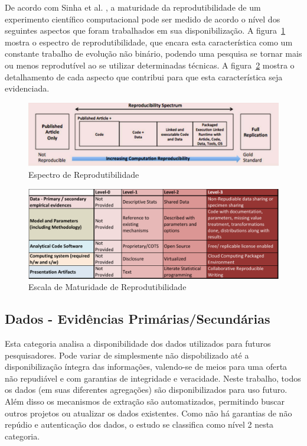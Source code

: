 \documentclass[12pt,openany,oneside,a4paper,english,brazil]{abntbibufjf}
\begin{document}
    De acordo com Sinha et al. \cite{sinha2016}, a maturidade da reprodutibilidade de um experimento científico computacional pode ser medido de acordo o nível dos seguintes aspectos que foram trabalhados em sua disponibilização. A figura~\ref{fig:espectro_reprodutibilidade} mostra o espectro de reprodutibilidade, que encara esta característica como um constante trabalho de evolução não binário, podendo uma pesquisa se tornar mais ou menos reprodutível ao se utilizar determinadas técnicas. A figura~\ref{fig:escala_reprodutibilidade} mostra o detalhamento de cada aspecto que contribui para que esta característica seja evidenciada.

    \begin{figure}[!htbp]
     \includegraphics[width=\textwidth]{espectro_reprodutibilidade}
     \caption{Espectro de Reprodutibilidade}\label{fig:espectro_reprodutibilidade}
    \end{figure}

    \begin{figure}[!htbp]
     \includegraphics[width=\textwidth]{escala_reprodutibilidade}
     \caption{Escala de Maturidade de Reprodutibilidade}\label{fig:escala_reprodutibilidade}
    \end{figure}


    \subsection{Dados - Evidências Primárias/Secundárias} Esta categoria analisa a disponibilidade dos dados utilizados para futuros pesquisadores. Pode variar de simplesmente não dispobilizado até a disponibilização íntegra das informações, valendo-se de meios para uma oferta não repudiável e com garantias de integridade e veracidade. Neste trabalho, todos os dados (em suas diferentes agregações) são disponibilizados para uso futuro. Além disso os mecanismos de extração são automatizados, permitindo buscar outros projetos ou atualizar os dados existentes. Como não há garantias de não repúdio e autenticação dos dados, o estudo se classifica como nível 2 nesta categoria.
\end{document}
